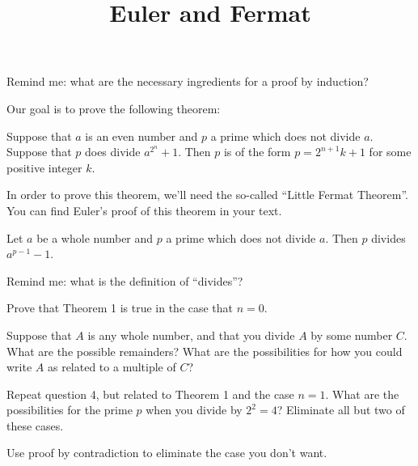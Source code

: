 \documentclass[handout,nooutcomes]{ximera}
\title{Euler and Fermat}
\begin{document}
\begin{abstract}
    
\end{abstract}
\maketitle

\begin{question}
Remind me: what are the necessary ingredients for a proof by induction?
\end{question}

Our goal is to prove the following theorem: 
\begin{theorem}
Suppose that $a$ is an even number and $p$ a prime which does not divide $a$.  Suppose that $p$ does divide $a^{2^n} + 1$.  Then $p$ is of the form $p = 2^{n+1}k + 1$ for some positive integer $k$.  
\end{theorem}

In order to prove this theorem, we'll need the so-called ``Little Fermat Theorem''.  You can find Euler's proof of this theorem in your text.
\begin{theorem}
Let $a$ be a whole number and $p$ a prime which does not divide $a$.  Then $p$ divides $a^{p-1} - 1$.
\end{theorem}

\begin{question}
Remind me: what is the definition of ``divides''?
\end{question}

\begin{question}
Prove that Theorem 1 is true in the case that $n=0$.
\end{question}

\begin{question}
Suppose that $A$ is any whole number, and that you divide $A$ by some number $C$.  What are the possible remainders?  What are the possibilities for how you could write $A$ as related to a multiple of $C$?
\end{question}

\begin{question}
Repeat question 4, but related to Theorem 1 and the case $n=1$.  What are the possibilities for the prime $p$ when you divide by $2^2 = 4$?  Eliminate all but two of these cases.
\end{question}

\begin{question}
Use proof by contradiction to eliminate the case you don't want.
\end{question}
\end{document}
